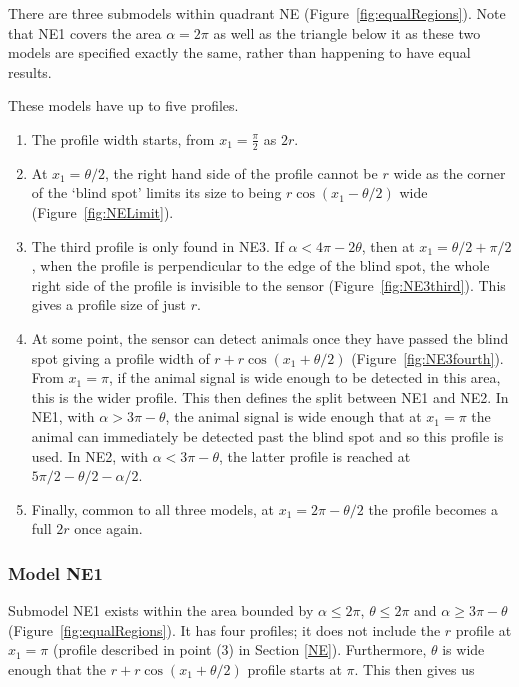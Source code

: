 There are three submodels within quadrant NE (Figure~\ref{fig:equalRegions}).
Note that NE1 covers the area $\alpha=2\pi$ as well as the triangle below it as these two models are specified exactly the same, rather than happening to have equal results.

These models have up to five profiles.

\begin{enumerate}
\item The profile width starts, from $x_1=\frac{\pi}{2}$ as $2r$.
\item At $x_1 = \theta/2$, the right hand side of the profile cannot be $r$ wide as the corner of the `blind spot' limits its size to being $r\cos(x_1 - \theta/2)$ wide (Figure~\ref{fig:NELimit}).

\item The third profile is only found in NE3.
If $\alpha < 4\pi - 2\theta$, then at $x_1=\theta/2 + \pi/2$, when the profile is perpendicular to the edge of the blind spot, the whole right side of the profile is invisible to the sensor (Figure~\ref{fig:NE3third}).
This gives a profile size of just $r$.

\item At some point, the sensor can detect animals once they have passed the blind spot giving a profile width of $r + r\cos(x_1 + \theta/2)$ (Figure~\ref{fig:NE3fourth}).
From $x_1=\pi$, if the animal signal is wide enough to be detected in this area, this is the wider profile.
This then defines the split between NE1 and NE2.
In NE1, with $\alpha > 3\pi - \theta$, the animal signal is wide enough that at $x_1=\pi$ the animal can immediately be detected past the blind spot and so this profile is used.
In NE2, with $\alpha < 3\pi - \theta$, the latter profile is reached at $5\pi/2 - \theta/2 - \alpha/2$.

\item Finally, common to all three models, at $x_1 = 2\pi - \theta/2$ the profile becomes a full $2r$ once again.
\label{NElist5}
\end{enumerate}



\subsubsection{Model NE1} \label{NE1}

Submodel NE1 exists within the area bounded by $\alpha\le2\pi$, $\theta\le2\pi$ and $\alpha \ge 3\pi - \theta$ (Figure~\ref{fig:equalRegions}).
It has four profiles; it does not include the $r$ profile at $x_1=\pi$ (profile described in point (3) in Section \ref{NE}).
Furthermore, $\theta$ is wide enough that the $r + r\cos(x_1 + \theta/2)$ profile starts at $\pi$.
This then gives us


